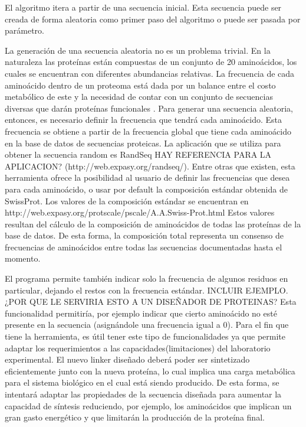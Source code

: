 El algoritmo itera a partir de una secuencia inicial. 
Esta secuencia puede ser creada de forma aleatoria como primer paso del algoritmo o puede ser pasada por parámetro. 

La generación de una secuencia aleatoria no es un problema trivial. 
En la naturaleza las proteínas están compuestas de un conjunto de 20 aminoácidos, los cuales se encuentran con diferentes abundancias relativas. 
La frecuencia de cada aminoácido dentro de un proteoma está dada por un balance entre el costo metabólico de este y la necesidad de contar con un conjunto de secuencias diversas que darán proteínas funcionales \cite{krick2014amino}. 
Para generar una secuencia aleatoria, entonces, es necesario definir la frecuencia que tendrá cada aminoácido. Esta frecuencia se obtiene a partir de la frecuencia global que tiene cada aminoácido en la base de datos de secuencias proteicas.
La aplicación que se utiliza para obtener la secuencia random es RandSeq 
HAY REFERENCIA PARA LA APLICACION?
(http://web.expasy.org/randseq/). Entre otras que existen, esta herramienta ofrece la posibilidad al usuario de definir las frecuencias que desea para cada aminoácido, o usar por default la composición estándar obtenida de SwissProt.  
Los valores de la composición estándar se encuentran en http://web.expasy.org/protscale/pscale/A.A.Swiss-Prot.html
Estos valores resultan del cálculo de la composición de aminoácidos de todas las proteínas de la base de datos. De esta forma, la composición total representa un consenso de frecuencias de aminoácidos entre todas las secuencias documentadas hasta el momento.

El programa permite también indicar solo la frecuencia de algunos residuos en particular, dejando el restos con la frecuencia estándar. INCLUIR EJEMPLO.
¿POR QUE LE SERVIRIA ESTO A UN DISEÑADOR DE PROTEINAS?
Esta funcionalidad permitiría, por ejemplo indicar que cierto aminoácido no esté presente en la secuencia (asignándole una frecuencia igual a 0). Para el fin que tiene la herramienta, es útil tener este tipo de funcionalidades ya que permite adaptar los requerimientos a las capacidades(limitaciones) del laboratorio experimental. El nuevo linker diseñado deberá poder ser sintetizado eficientemente junto con la nueva proteína, lo cual implica una carga metabólica para el sistema biológico en el cual está siendo producido. De esta forma, se intentará adaptar las propiedades de la secuencia diseñada para aumentar la capacidad de síntesis reduciendo, por ejemplo, los aminoácidos que implican un gran gasto energético y que limitarán la producción de la proteína final.


